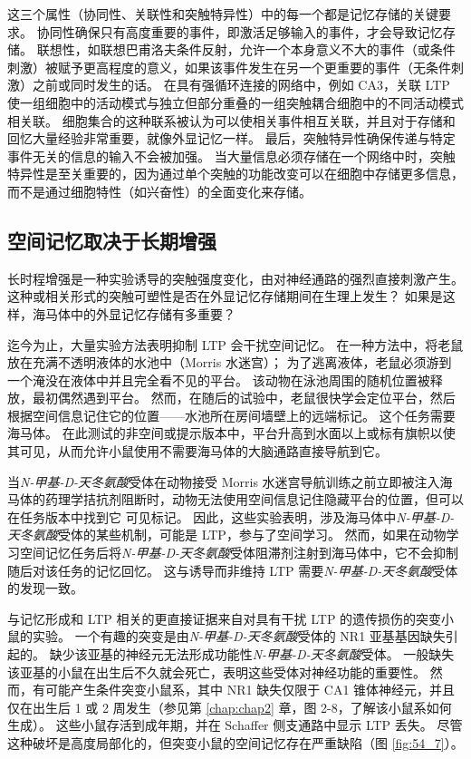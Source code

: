这三个属性（协同性、关联性和突触特异性）中的每一个都是记忆存储的关键要求。
协同性确保只有高度重要的事件，即激活足够输入的事件，才会导致记忆存储。
联想性，如联想巴甫洛夫条件反射，允许一个本身意义不大的事件（或条件刺激）被赋予更高程度的意义，如果该事件发生在另一个更重要的事件（无条件刺激）之前或同时发生的话。
在具有强循环连接的网络中，例如 CA3，关联 LTP 使一组细胞中的活动模式与独立但部分重叠的一组突触耦合细胞中的不同活动模式相关联。
细胞集合的这种联系被认为可以使相关事件相互关联，并且对于存储和回忆大量经验非常重要，就像外显记忆一样。
最后，突触特异性确保传递与特定事件无关的信息的输入不会被加强。
当大量信息必须存储在一个网络中时，突触特异性是至关重要的，因为通过单个突触的功能改变可以在细胞中存储更多信息，而不是通过细胞特性（如兴奋性）的全面变化来存储。



\subsection{空间记忆取决于长期增强}

长时程增强是一种实验诱导的突触强度变化，由对神经通路的强烈直接刺激产生。
这种或相关形式的突触可塑性是否在外显记忆存储期间在生理上发生？
如果是这样，海马体中的外显记忆存储有多重要？


迄今为止，大量实验方法表明抑制 LTP 会干扰空间记忆。
在一种方法中，将老鼠放在充满不透明液体的水池中（Morris 水迷宫）；
为了逃离液体，老鼠必须游到一个淹没在液体中并且完全看不见的平台。
该动物在泳池周围的随机位置被释放，最初偶然遇到平台。
然而，在随后的试验中，老鼠很快学会定位平台，然后根据空间信息记住它的位置——水池所在房间墙壁上的远端标记。
这个任务需要海马体。
在此测试的非空间或提示版本中，平台升高到水面以上或标有旗帜以使其可见，从而允许小鼠使用不需要海马体的大脑通路直接导航到它。


当\textit{N-甲基-D-天冬氨酸}受体在动物接受 Morris 水迷宫导航训练之前立即被注入海马体的药理学拮抗剂阻断时，动物无法使用空间信息记住隐藏平台的位置，但可以在任务版本中找到它 可见标记。
因此，这些实验表明，涉及海马体中\textit{N-甲基-D-天冬氨酸}受体的某些机制，可能是 LTP，参与了空间学习。
然而，如果在动物学习空间记忆任务后将\textit{N-甲基-D-天冬氨酸}受体阻滞剂注射到海马体中，它不会抑制随后对该任务的记忆回忆。
这与诱导而非维持 LTP 需要\textit{N-甲基-D-天冬氨酸}受体的发现一致。


与记忆形成和 LTP 相关的更直接证据来自对具有干扰 LTP 的遗传损伤的突变小鼠的实验。
一个有趣的突变是由\textit{N-甲基-D-天冬氨酸}受体的 NR1 亚基基因缺失引起的。
缺少该亚基的神经元无法形成功能性\textit{N-甲基-D-天冬氨酸}受体。
一般缺失该亚基的小鼠在出生后不久就会死亡，表明这些受体对神经功能的重要性。
然而，有可能产生条件突变小鼠系，其中 NR1 缺失仅限于 CA1 锥体神经元，并且仅在出生后 1 或 2 周发生（参见第 \ref{chap:chap2} 章，图 2-8，了解该小鼠系如何 生成）。
这些小鼠存活到成年期，并在 Schaffer 侧支通路中显示 LTP 丢失。
尽管这种破坏是高度局部化的，但突变小鼠的空间记忆存在严重缺陷（图 \ref{fig:54_7}）。


